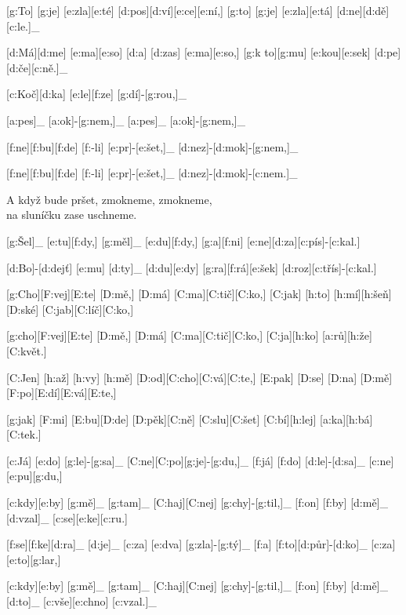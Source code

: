 
[g:To] [g:je] [e:zla][e:té] [d:pos][d:ví][e:ce][e:ní,] %
[g:to] [g:je] [e:zla][e:tá] [d:ne][d:dě][c:le.]_

[d:Má][d:me] [e:ma][e:so] [d:a] [d:zas] [e:ma][e:so,] %
[g:k to][g:mu] [e:kou][e:sek] [d:pe][d:če][c:ně.]_



[c:Koč][d:ka] [e:le][f:ze] [g:dí]-[g:rou,]_

[a:pes]_ [a:ok]-[g:nem,]_
[a:pes]_ [a:ok]-[g:nem,]_

[f:ne][f:bu][f:de] [f:-li] [e:pr]-[e:šet,]_
[d:nez]-[d:mok]-[g:nem,]_

[f:ne][f:bu][f:de] [f:-li] [e:pr]-[e:šet,]_
[d:nez]-[d:mok]-[c:nem.]_

A když bude pršet, zmokneme, zmokneme,\\
na sluníčku zase uschneme.



[g:Šel]_ [e:tu][f:dy,] %
[g:měl]_ [e:du][f:dy,] %
[g:a][f:ni] [e:ne][d:za][c:pís]-[c:kal.]

[d:Bo]-[d:dejť] [e:mu] [d:ty]_ [d:du][e:dy] %
[g:ra][f:rá][e:šek] [d:roz][c:třís]-[c:kal.]



[g:Cho][F:vej][E:te] [D:mě,] [D:má] [C:ma][C:tič][C:ko,] %
[C:jak] [h:to] [h:mí][h:šeň][D:ské] [C:jab][C:líč][C:ko,]

[g:cho][F:vej][E:te] [D:mě,] [D:má] [C:ma][C:tič][C:ko,] %
[C:ja][h:ko] [a:rů][h:že] [C:květ.]

[C:Jen] [h:až] [h:vy] [h:mě] [D:od][C:cho][C:vá][C:te,] %
[E:pak] [D:se] [D:na] [D:mě] [F:po][E:dí][E:vá][E:te,]

[g:jak] [F:mi] [E:bu][D:de] [D:pěk][C:ně] [C:slu][C:šet] %
[C:bí][h:lej] [a:ka][h:bá][C:tek.]



[c:Já] [e:do] [g:le]-[g:sa]_ [C:ne][C:po][g:je]-[g:du,]_
[f:já] [f:do] [d:le]-[d:sa]_ [c:ne][e:pu][g:du,]

[c:kdy][e:by] [g:mě]_ [g:tam]_ [C:haj][C:nej] [g:chy]-[g:til,]_
[f:on] [f:by] [d:mě]_ [d:vzal]_ [c:se][e:ke][c:ru.]

[f:se][f:ke][d:ra]_ [d:je]_ [c:za] [e:dva] [g:zla]-[g:tý]_
[f:a] [f:to][d:půr]-[d:ko]_ [c:za] [e:to][g:lar,]

[c:kdy][e:by] [g:mě]_ [g:tam]_ [C:haj][C:nej] [g:chy]-[g:til,]_
[f:on] [f:by] [d:mě]_ [d:to]_ [c:vše][e:chno] [c:vzal.]_


